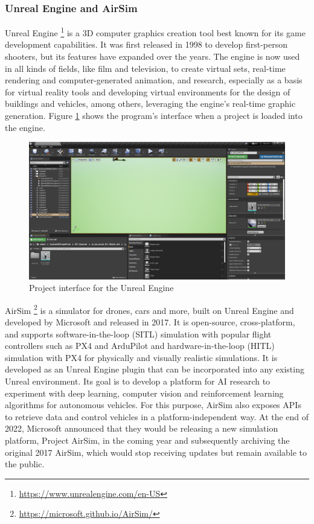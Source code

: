 \subsubsection{Unreal Engine and AirSim}
\label{subsec:unreal}

Unreal Engine \footnote{\url{https://www.unrealengine.com/en-US}} is a 3D computer graphics creation tool best known for its game development capabilities.
It was first released in 1998 to develop first-person shooters, but its features have expanded over the years.
The engine is now used in all kinds of fields, like film and television, to create virtual sets, real-time rendering and computer-generated animation, and research, especially as a basis for virtual reality tools and developing virtual environments for the design of buildings and vehicles, among others, leveraging the engine's real-time graphic generation.
Figure \ref{fig:ue-interface} shows the program's interface when a project is loaded into the engine.

\begin{figure}
  \centering
  \includegraphics[width=\textwidth,keepaspectratio]{img/ue-interface.png}
  \caption{Project interface for the Unreal Engine}\label{fig:ue-interface}
\end{figure}

AirSim \footnote{\url{https://microsoft.github.io/AirSim/}} is a simulator for drones, cars and more, built on Unreal Engine and developed by Microsoft and released in 2017.
It is open-source, cross-platform, and supports software-in-the-loop (SITL) simulation with popular flight controllers such as PX4 and ArduPilot and hardware-in-the-loop (HITL) simulation with PX4 for physically and visually realistic simulations. 
It is developed as an Unreal Engine plugin that can be incorporated into any existing Unreal environment.
Its goal is to develop a platform for AI research to experiment with deep learning, computer vision and reinforcement learning algorithms for autonomous vehicles. For this purpose, AirSim also exposes APIs to retrieve data and control vehicles in a platform-independent way.
At the end of 2022, Microsoft announced that they would be releasing a new simulation platform, Project AirSim, in the coming year and subsequently archiving the original 2017 AirSim, which would stop receiving updates but remain available to the public.

